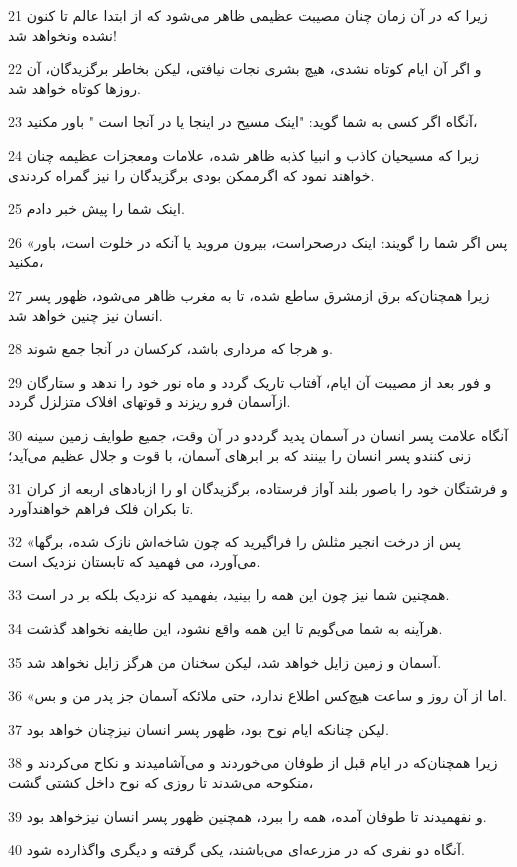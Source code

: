 \par 21 زیرا که در آن زمان چنان مصیبت عظیمی ظاهر می‌شود که از ابتدا عالم تا کنون نشده ونخواهد شد!
\par 22 و اگر آن ایام کوتاه نشدی، هیچ بشری نجات نیافتی، لیکن بخاطر برگزیدگان، آن روزها کوتاه خواهد شد.
\par 23 آنگاه اگر کسی به شما گوید: "اینک مسیح در اینجا یا در آنجا است " باور مکنید،
\par 24 زیرا که مسیحیان کاذب و انبیا کذبه ظاهر شده، علامات ومعجزات عظیمه چنان خواهند نمود که اگرممکن بودی برگزیدگان را نیز گمراه کردندی.
\par 25 اینک شما را پیش خبر دادم.
\par 26 «پس اگر شما را گویند: اینک درصحراست، بیرون مروید یا آنکه در خلوت است، باور مکنید،
\par 27 زیرا همچنان‌که برق ازمشرق ساطع شده، تا به مغرب ظاهر می‌شود، ظهور پسر انسان نیز چنین خواهد شد.
\par 28 و هرجا که مرداری باشد، کرکسان در آنجا جمع شوند.
\par 29 و فور بعد از مصیبت آن ایام، آفتاب تاریک گردد و ماه نور خود را ندهد و ستارگان ازآسمان فرو ریزند و قوتهای افلاک متزلزل گردد.
\par 30 آنگاه علامت پسر انسان در آسمان پدید گرددو در آن وقت، جمیع طوایف زمین سینه زنی کنندو پسر انسان را بینند که بر ابرهای آسمان، با قوت و جلال عظیم می‌آید؛
\par 31 و فرشتگان خود را باصور بلند آواز فرستاده، برگزیدگان او را ازبادهای اربعه از کران تا بکران فلک فراهم خواهندآورد.
\par 32 «پس از درخت انجیر مثلش را فرا‌گیرید که چون شاخه‌اش نازک شده، برگها می‌آورد، می فهمید که تابستان نزدیک است.
\par 33 همچنین شما نیز چون این همه را بینید، بفهمید که نزدیک بلکه بر در است.
\par 34 هرآینه به شما می‌گویم تا این همه واقع نشود، این طایفه نخواهد گذشت.
\par 35 آسمان و زمین زایل خواهد شد، لیکن سخنان من هرگز زایل نخواهد شد.
\par 36 «اما از آن روز و ساعت هیچ‌کس اطلاع ندارد، حتی ملائکه آسمان جز پدر من و بس.
\par 37 لیکن چنانکه ایام نوح بود، ظهور پسر انسان نیزچنان خواهد بود.
\par 38 زیرا همچنان‌که در ایام قبل از طوفان می‌خوردند و می‌آشامیدند و نکاح می‌کردند و منکوحه می‌شدند تا روزی که نوح داخل کشتی گشت،
\par 39 و نفهمیدند تا طوفان آمده، همه را ببرد، همچنین ظهور پسر انسان نیزخواهد بود.
\par 40 آنگاه دو نفری که در مزرعه‌ای می‌باشند، یکی گرفته و دیگری واگذارده شود.
